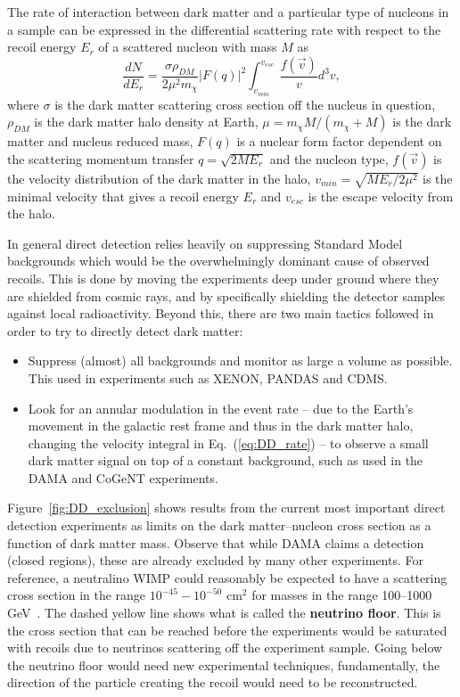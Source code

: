 \documentclass[notes.tex]{subfiles}
\begin{document}
The rate of interaction between dark matter and a particular type of nucleons in a sample can be expressed in the differential scattering rate with respect to the recoil energy $E_r$ of a scattered nucleon with mass $M$ as
\begin{equation}
\frac{dN}{dE_r} = \frac{\sigma \rho_{DM}}{2\mu^2 m_\chi}|F(q)|^2\int_{v_{min}}^{v_{esc}} \frac{f(\vec v)}{v}d^3v,
\label{eq:DD_rate}
\end{equation}
where $\sigma$ is the dark matter scattering cross section off the nucleus in question, $\rho_{DM}$ is the dark matter halo density at Earth, $\mu=m_\chi M/(m_\chi+M)$ is the dark matter and nucleus reduced mass, $F(q)$ is a nuclear form factor dependent on the scattering momentum transfer $q=\sqrt{2ME_r}$ and the nucleon type, $f(\vec v)$ is the velocity distribution of the dark matter in the halo, $v_{min}=\sqrt{ME_r/2\mu^2}$ is the minimal velocity that gives a recoil energy $E_r$ and $v_{esc}$ is the escape velocity from the halo.

In general direct detection relies heavily on suppressing Standard Model backgrounds which would be the overwhelmingly dominant cause of observed recoils. This is done by moving the experiments deep under ground where they are shielded from cosmic rays, and by specifically shielding the detector samples against local radioactivity. Beyond this, there are  two main tactics followed in order to try to directly detect dark matter:
\begin{itemize}
\item Suppress (almost) all backgrounds and monitor as large a volume as possible. This used in experiments such as XENON, PANDAS and CDMS.
\item Look for an annular modulation in the event rate -- due to the Earth's movement in the galactic rest frame and thus in the dark matter halo, changing the velocity integral in Eq.~(\ref{eq:DD_rate}) -- to observe a small dark matter signal on top of a constant background, such as used in the DAMA and CoGeNT experiments.
\end{itemize}

Figure~\ref{fig:DD_exclusion} shows results from the current most important direct detection experiments as limits on the dark matter--nucleon cross section as a function of dark matter mass. Observe that while DAMA claims a detection (closed regions), these are already excluded by many other experiments. For reference, a neutralino WIMP could reasonably be expected to have a scattering cross section in the range $10^{-45}-10^{-50}$ cm$^2$ for masses in the range 100--1000 GeV~\cite{GAMBIT:2017zdo}. The dashed yellow line shows what is called the {\bf neutrino floor}. This is the cross section that can be reached before the experiments would be saturated with recoils due to neutrinos scattering off the experiment sample. Going below the neutrino floor would need new experimental techniques, fundamentally, the direction of the particle creating the recoil would need to be reconstructed.
\end{document}
